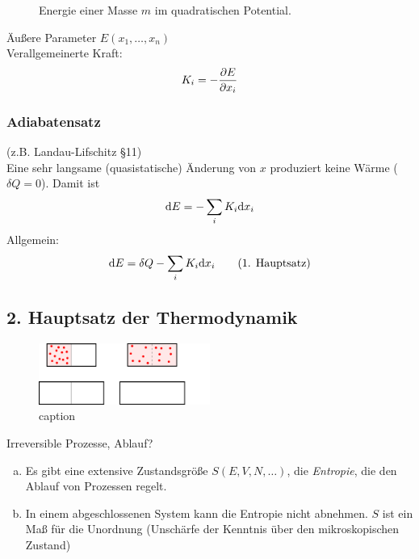 \begin{enumerate}[a)]
          \begin{figure}[H]
        \centering
        \def\svgwidth{0.4\textwidth}
        
        \caption{Energie einer Masse $m$ im quadratischen Potential.}
        \label{img:controlledDeltaWork}
    \end{figure}
    
    Äußere Parameter $E(x_1, \ldots, x_n)$ \\
    Verallgemeinerte Kraft:
    \begin{equation}
        K_i = - \frac{\partial E}{\partial x_i}
    \end{equation}
\end{enumerate}
\subsubsection{Adiabatensatz}
(z.B. Landau-Lifschitz §11) \\
Eine sehr langsame (quasistatische) Änderung von $x$ produziert keine Wärme ($\delta Q = 0$). Damit ist
\begin{equation}
    \mathrm{d} E = - \sum_i K_i \mathrm{d} x_i
\end{equation}
Allgemein:
\begin{equation}
    \mathrm{d} E = \delta Q - \sum_i K_i \mathrm{d} x_i \qquad \text{(1. Hauptsatz)}
\end{equation}

\subsection{2. Hauptsatz der Thermodynamik}
\begin{figure}[H]
    \begin{center}
        \includegraphics[width=0.5\textwidth]{../img/irrevProcess.pdf}
        \caption{caption}  %
        \label{img:irrevProcess}
    \end{center}
\end{figure}
Irreversible Prozesse, Ablauf?
\begin{enumerate}[a)]
    \item Es gibt eine extensive Zustandsgröße $S(E, V, N, \ldots)$, die \emph{Entropie}, die den Ablauf von Prozessen regelt.
    \item In einem abgeschlossenen System kann die Entropie nicht abnehmen. $S$ ist ein Maß für die Unordnung
    (Unschärfe der Kenntnis über den mikroskopischen Zustand)
\end{enumerate}

